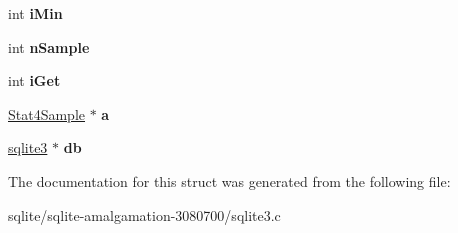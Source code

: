 \begin{DoxyCompactItemize}
\item 
\hypertarget{struct_stat4_accum_a9935fae376aa4010a0d205e7a3283d36}{int {\bfseries i\+Min}}\label{struct_stat4_accum_a9935fae376aa4010a0d205e7a3283d36}

\item 
\hypertarget{struct_stat4_accum_ae96fc8b759131bd3d968086a009a9170}{int {\bfseries n\+Sample}}\label{struct_stat4_accum_ae96fc8b759131bd3d968086a009a9170}

\item 
\hypertarget{struct_stat4_accum_aee70ce1c45daa00581265d27337bce5e}{int {\bfseries i\+Get}}\label{struct_stat4_accum_aee70ce1c45daa00581265d27337bce5e}

\item 
\hypertarget{struct_stat4_accum_a921a2a1d92fe8113626bde517d004278}{\hyperlink{struct_stat4_sample}{Stat4\+Sample} $\ast$ {\bfseries a}}\label{struct_stat4_accum_a921a2a1d92fe8113626bde517d004278}

\item 
\hypertarget{struct_stat4_accum_af0ae3ddd7a24a925ebe090db6f06a12b}{\hyperlink{structsqlite3}{sqlite3} $\ast$ {\bfseries db}}\label{struct_stat4_accum_af0ae3ddd7a24a925ebe090db6f06a12b}

\end{DoxyCompactItemize}


The documentation for this struct was generated from the following file\+:\begin{DoxyCompactItemize}
\item 
sqlite/sqlite-\/amalgamation-\/3080700/sqlite3.\+c\end{DoxyCompactItemize}
